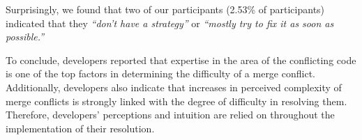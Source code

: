 Surprisingly, we found that two of our participants (2.53\% of participants) indicated that they \textit{``don't have a strategy''} or \textit{``mostly try to fix it as soon as possible.''}


To conclude, developers reported that expertise in the area of the conflicting code is one of the top factors in determining the difficulty of a merge conflict.
Additionally, developers also indicate that increases in perceived complexity of merge conflicts is strongly linked with the degree of difficulty in resolving them.
Therefore, developers' perceptions and intuition are relied on throughout the implementation of their resolution.